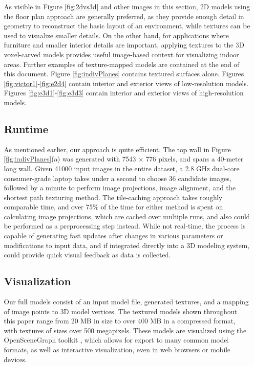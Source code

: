 \documentclass[]{spie}  %
\begin{document}
As visible in Figure \ref{fig:2dvs3d} and other images in this
section, 2D models using the floor plan approach are generally
preferred, as they provide enough detail in geometry to reconstruct
the basic layout of an environment, while textures can be used to
visualize smaller details. On the other hand, for applications where
furniture and smaller interior details are important, applying
textures to the 3D voxel-carved models provides useful image-based
context for visualizing indoor areas. Further examples of
texture-mapped models are contained at the end of this
document. Figure \ref{fig:indivPlanes} contains textured surfaces
alone. Figures \ref{fig:victor1}-\ref{fig:e2d4} contain interior and
exterior views of low-resolution models. Figures
\ref{fig:e3d1}-\ref{fig:e3d3} contain interior and exterior views of
high-resolution models.


\subsection{Runtime}
As mentioned earlier, our approach is quite efficient. The top wall in
Figure \ref{fig:indivPlanes}(a) was generated with 7543 $\times$ 776
pixels, and spans a 40-meter long wall. Given 41000 input images in
the entire dataset, a 2.8 GHz dual-core consumer-grade laptop takes
under a second to choose 36 candidate images, followed by a minute to
perform image projections, image alignment, and the shortest path
texturing method. The tile-caching approach takes roughly comparable
time, and over 75\% of the time for either method is spent on
calculating image projections, which are cached over multiple runs,
and also could be performed as a preprocessing step instead. While not
real-time, the process is capable of generating fast updates after
changes in various parameters or modifications to input data, and if
integrated directly into a 3D modeling system, could provide quick
visual feedback as data is collected.


\subsection{Visualization}
Our full models consist of an input model file, generated textures,
and a mapping of image points to 3D model vertices. The textured
models shown throughout this paper range from 20 MB in size to over
400 MB in a compressed format, with textures of sizes over 500
megapixels. These models are visualized using the OpenSceneGraph
toolkit \cite{openscenegraph}, which allows for export to many common
model formats, as well as interactive visualization, even in web
browsers or mobile devices.
\end{document}
